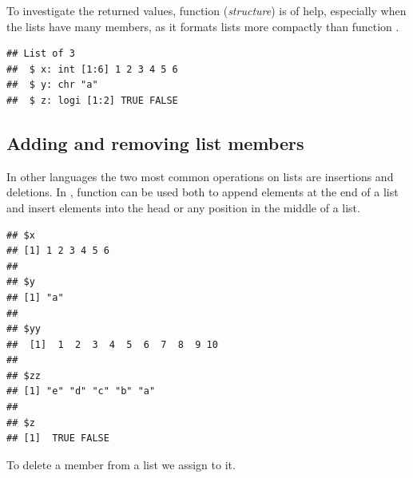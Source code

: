 \documentclass[krantz2]{krantz}\usepackage{knitr}
\begin{document}
To investigate the returned values, function  (\emph{structure}) is of help, especially when the lists have many members, as it formats lists more compactly than function .

\begin{knitrout}\footnotesize
{}\color{fgcolor}\begin{kframe}
\begin{alltt}
\end{alltt}
\begin{verbatim}
## List of 3
##  $ x: int [1:6] 1 2 3 4 5 6
##  $ y: chr "a"
##  $ z: logi [1:2] TRUE FALSE
\end{verbatim}
\end{kframe}
\end{knitrout}


\subsection{Adding and removing list members}
In other languages the two most common operations on lists are insertions and deletions. In \Rlang, function  can be used both to append elements at the end of a list and insert elements into the head or any position in the middle of a list.

\begin{knitrout}\footnotesize
{}\color{fgcolor}\begin{kframe}
\begin{alltt}
 \hlkwb{<-}  \hlstd{(} \hlstd{=} \hlopt{:}\hlstd{,}  \hlstd{= letters[}\hlopt{:}\hlstd{]),} \hlstd{)}
\end{alltt}
\begin{verbatim}
## $x
## [1] 1 2 3 4 5 6
##
## $y
## [1] "a"
##
## $yy
##  [1]  1  2  3  4  5  6  7  8  9 10
##
## $zz
## [1] "e" "d" "c" "b" "a"
##
## $z
## [1]  TRUE FALSE
\end{verbatim}
\end{kframe}
\end{knitrout}

To delete a member from a list we assign  to it.
\end{document}
